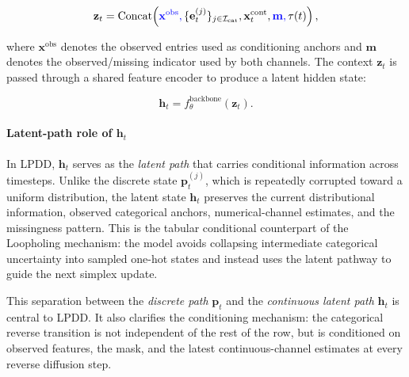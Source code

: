 \documentclass[times, review, 10pt]{elsarticle}
\newcommand{\DIFaddbegin}{\begingroup\color{blue}}
\newcommand{\DIFaddend}{\endgroup}
\begin{document}
\begin{equation}
\mathbf{z}_t =
\mathrm{Concat}\!\left(
\DIFaddbegin
\mathbf{x}^{\mathrm{obs}},
\DIFaddend
\{\mathbf{e}^{(j)}_t\}_{j\in\mathcal{I}_{\mathrm{cat}}},
\mathbf{x}^{\mathrm{cont}}_t,
\DIFaddbegin
\mathbf{m},
\DIFaddend
\tau(t)
\right),
\DIFaddbegin
\label{eq:lpdd_context}
\DIFaddend
\end{equation}

\DIFaddbegin
where $\mathbf{x}^{\mathrm{obs}}$ denotes the observed entries used as
conditioning anchors and $\mathbf{m}$ denotes the observed/missing indicator
used by both channels. The context $\mathbf{z}_t$ is passed through a shared feature
encoder to produce a latent hidden state:
\DIFaddend

\begin{equation}
\mathbf{h}_t = f_{\theta}^{\mathrm{backbone}}(\mathbf{z}_t).
\label{eq:project}
\end{equation}

\paragraph{Latent-path role of $\mathbf{h}_t$}
In LPDD, $\mathbf{h}_t$ serves as the \emph{latent path} that carries
\DIFaddbegin
conditional information across timesteps. Unlike the discrete state
$\mathbf{p}_t^{(j)}$, which is repeatedly corrupted toward a uniform
distribution, the latent state $\mathbf{h}_t$ preserves the current
distributional information, observed categorical anchors, numerical-channel
estimates, and the missingness pattern. This is the tabular conditional
counterpart of the Loopholing mechanism: the model avoids collapsing
intermediate categorical uncertainty into sampled one-hot states and instead
uses the latent pathway to guide the next simplex update.
\DIFaddend

This separation between the \emph{discrete path} $\mathbf{p}_t$ and the
\DIFaddbegin
\emph{continuous latent path} $\mathbf{h}_t$ is central to LPDD. It also
clarifies the conditioning mechanism: the categorical reverse transition is
not independent of the rest of the row, but is conditioned on observed
features, the mask, and the latest continuous-channel estimates at every
reverse diffusion step.
\DIFaddend
\end{document}
